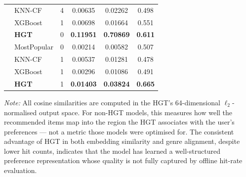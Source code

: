 \begin{longtable}{llcccc}
  & KNN-CF        & 4 & 0.00635 & 0.02262 & 0.498\\
  & XGBoost       & 1 & 0.00698 & 0.01664 & 0.551\\
  & \textbf{HGT}  & 0 & \textbf{0.11951} & \textbf{0.70869} & \textbf{0.611}\\
\midrule
{}
  & MostPopular   & 0 & 0.00214 & 0.00582 & 0.507\\
  & KNN-CF        & 1 & 0.00537 & 0.01281 & 0.478\\
  & XGBoost       & 1 & 0.00296 & 0.01086 & 0.491\\
  & \textbf{HGT}  & 1 & \textbf{0.01403} & \textbf{0.03824} & \textbf{0.665}\\
\end{longtable}

\noindent\textit{Note:} All cosine similarities are computed in the HGT's 64-dimensional $\ell_2$-normalised output space. For non-HGT models, this measures how well the recommended items map into the region the HGT associates with the user's preferences — not a metric those models were optimised for. The consistent advantage of HGT in both embedding similarity and genre alignment, despite lower hit counts, indicates that the model has learned a well-structured preference representation whose quality is not fully captured by offline hit-rate evaluation.
